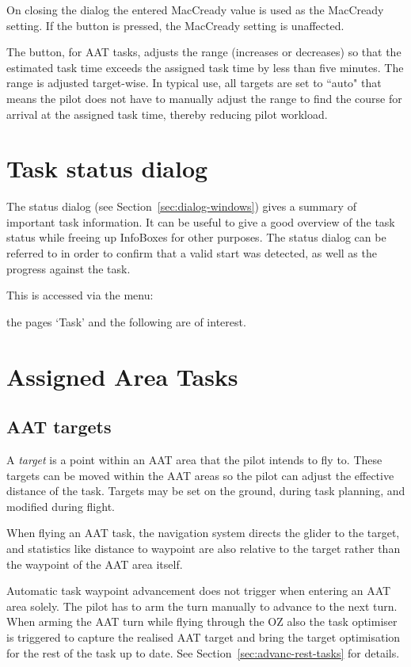 \documentclass[a4paper,12pt]{refrep}
\begin{document}
On closing the dialog the entered MacCready value is used as the MacCready 
setting. If the  button is pressed, the MacCready setting is 
unaffected.

The  button, for AAT tasks, adjusts the range
(increases or decreases) so that the estimated task time exceeds the
assigned task time by less than five minutes.  The range is adjusted
target-wise. In typical use, all targets are set to ``auto" that means the pilot 
does not have to manually adjust the range to find the course for arrival at 
the assigned task time, thereby reducing pilot workload.


\section{Task status dialog}

The status dialog (see Section~\ref{sec:dialog-windows}) gives a
summary of important task information.  It can be useful to give a
good overview of the task status while freeing up InfoBoxes for other
purposes.  The status dialog can be referred to in order to confirm
that a valid start was detected, as well as the progress against the
task.

This is accessed via the menu:
\begin{quote}
\blink{}\blink{}
\end{quote}
the pages `Task' and the following are of interest.

\section{Assigned Area Tasks}\label{sec:aat-tasks}

\subsection*{AAT targets}

A {\em target} is a point within an AAT area that the pilot intends to
fly to.  These targets can be moved within the AAT areas so the pilot
can adjust the effective distance of the task.  Targets may be set on
the ground, during task planning, and modified during flight.

When flying an AAT task, the navigation system directs the glider to
the target, and statistics like distance to waypoint are also relative
to the target rather than the waypoint of the AAT area itself.

Automatic task waypoint advancement does not trigger when entering an
AAT area solely. The pilot has to arm the turn manually to advance to the next
turn. When arming the AAT turn while flying through the OZ also the task
optimiser is triggered to capture the realised AAT target and bring the target
optimisation for the rest of the task up to date. See Section~\ref{sec:advanc-rest-tasks} for details.
\end{document}
